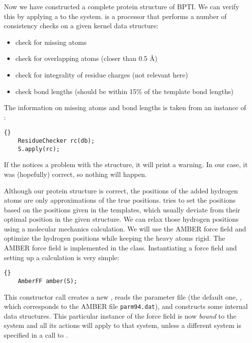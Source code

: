\noindent
Now we have constructed a complete protein structure of BPTI. We can verify
this by applying a  to the system.
 is a processor that performs a number of consistency
checks on a given kernel data structure:
\begin{itemize}
	\item check for missing atoms
	\item check for overlapping atoms (closer than 0.5 \AA)
	\item check for integrality of residue charges (not relevant here)
	\item check bond lengths (should be within 15\% of the template bond lengths)
\end{itemize}
The information on missing atoms and bond lengths is taken from an instance
of :

\begin{lstlisting}{}
	ResidueChecker rc(db);
	S.apply(rc);
\end{lstlisting}
	
\noindent
If the  notices a problem with the structure, it will 
print a warning. In our case, it was (hopefully) correct, so nothing will
happen.

Although our protein structure is correct, the positions of the added hydrogen
atoms are only approximations of the true positions.
 tries to set the positions based on the
positions given in the  templates, which usually deviate
from their optimal position in the given structure. We can relax those
hydrogen positions using a molecular mechanics calculation.
We will use the AMBER force field\cite{AMBER95} and optimize the hydrogen 
positions while keeping the heavy atoms rigid. The AMBER force field is
implemented in the  class. Instantiating a force field and
setting up a calculation is very simple:

\begin{lstlisting}{}
	AmberFF amber(S);
\end{lstlisting}

\noindent
This constructor call creates a new , reads the parameter
file (the default one, , which corresponds to the AMBER
file {\tt parm94.dat}), and constructs some internal data structures.
This particular instance of the force field is now {\em bound} to the 
system and all its actions will apply to that system, unless a different
system is specified in a call to .

